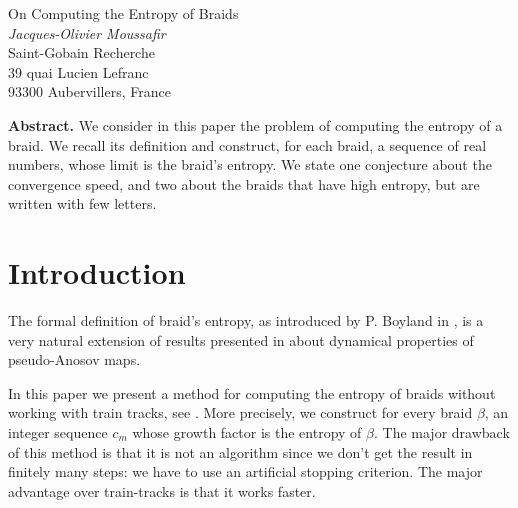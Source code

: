 \documentclass[a4paper, 11pt, leqno]{article}
\newcounter{prop}[section]
\newcounter{ex}[section]
\newcounter{conj}[section]
\begin{document}

\begin{center}
{\Large  On Computing the Entropy of Braids} \\[0.2cm]
{\it Jacques-Olivier Moussafir}\\[0.4cm]
{\small Saint-Gobain Recherche \\
39 quai Lucien Lefranc \\
93300 Aubervillers, France}
\end{center}

\vspace{0.4cm}
\noindent
{\bf Abstract.} 
We consider in this paper the problem of computing the 
entropy of a braid. We recall its definition and construct, 
for each braid, a sequence of real numbers, whose limit is 
the braid's entropy.
We state one conjecture about the convergence speed, 
and two about the braids that have high entropy, 
but are written with few letters.




\section{Introduction}
The formal definition of braid's entropy,
as introduced by P. Boyland in \cite{Boyland}, is a very
natural extension of results presented in \cite{FLP} about 
dynamical properties of pseudo-Anosov maps. 

In this paper we present a method for computing the entropy of braids
without working with train tracks, see \cite{BH}. More precisely, we
construct for every braid $\beta$, an integer sequence $c_m$
whose growth factor is the entropy of $\beta$. 
The major drawback of this method is that it is not an algorithm 
since we don't get the result in finitely many steps: 
we have to use an artificial stopping criterion. 
The major advantage over train-tracks is that it works faster. 
\end{document}
